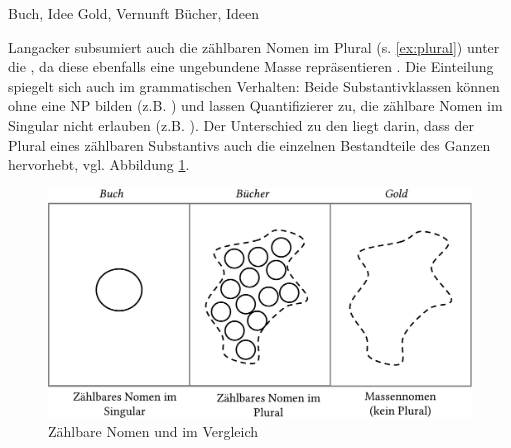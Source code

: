 \begin{exe}
	\ex \label{ex:zaehlbarkeit}
	\begin{xlist}
		\ex \label{ex:count} Buch, Idee
 		\ex \label{ex:mass} Gold, Vernunft
 	 	\ex \label{ex:plural} Bücher, Ideen 
 			\end{xlist}
\end{exe}

\noindent
Langacker subsumiert auch die zählbaren Nomen im Plural  (s. \ref{ex:plural}) unter die , da diese ebenfalls eine ungebundene Masse repräsentieren \parencite[77]{Langacker1991}. Die Einteilung spiegelt sich auch im grammatischen Verhalten: Beide Substantivklassen  können ohne  eine NP  bilden (z.B. ) und lassen Quantifizierer zu, die zählbare Nomen im Singular  nicht erlauben (z.B. ). Der Unterschied zu den  liegt darin, dass der Plural  eines zählbaren Substantivs  auch die einzelnen Bestandteile des Ganzen hervorhebt, vgl. Abbildung \ref{abb:langacker-nomen}.

\begin{figure}[h]
\begin{center}
\includegraphics[width=\textwidth]{images/langacker.pdf}
\caption {Zählbare Nomen und  im Vergleich \\ \parencite[][78]{Langacker1991}}
\label{abb:langacker-nomen}
\end{center}
\end{figure}


